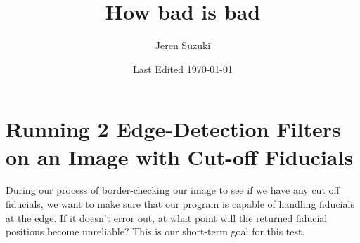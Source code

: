 \documentclass[10pt]{scrartcl}
\title{How bad is bad}
\author{Jeren Suzuki}
\date{Last Edited \today}
\begin{document}
\maketitle
{}
\tableofcontents
\newpage
{}

\section{Running 2 Edge-Detection Filters on an Image with Cut-off Fiducials} %
\label{sec:running_2_edge_detection_filters_on_an_image_with_cut_off_fiducials}

During our process of border-checking our image to see if we have any cut off fiducials, we want to make sure that our program is capable of handling fiducials at the edge. If it doesn't error out, at what point will the returned fiducial positions become unreliable? This is our short-term goal for this test. 
\end{document}
